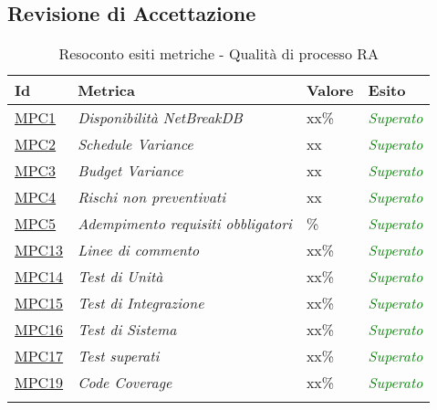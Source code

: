 \subsection{Revisione di Accettazione}

\begin{longtable}{|>{\centering\arraybackslash}p{2cm}|>{\centering\arraybackslash}p{5cm}|>{\centering\arraybackslash}p{3cm}|>{\centering\arraybackslash}p{3cm}|}
	\hline
	\rowcolor{Gray}
	\textbf{Id} & \textbf{Metrica} & \textbf{Valore} & \textbf{Esito} \\
	\hline
	\hyperlink{MPC1}{MPC1} & \textit{Disponibilità \textit{NetBreakDB}} & xx\% & \textcolor{Green}{\textit{Superato}}\\
	\hline
	\hyperlink{MPC2}{MPC2} & \textit{Schedule Variance} & xx & \textcolor{Green}{\textit{Superato}}\\
	\hline
	\hyperlink{MPC3}{MPC3} & \textit{Budget Variance} & xx & \textcolor{Green}{\textit{Superato}}\\
	\hline
	\hyperlink{MPC4}{MPC4} & \textit{Rischi non preventivati} & xx & \textcolor{Green}{\textit{Superato}}\\
	\hline
	\hyperlink{MPC5}{MPC5} & \textit{Adempimento requisiti obbligatori} & 100\% & \textcolor{Green}{\textit{Superato}}\\
	\hline
	\hyperlink{MPC13}{MPC13} & \textit{Linee di commento} & xx\% & \textcolor{Green}{\textit{Superato}}\\
	\hline
	\hyperlink{MPC14}{MPC14} & \textit{Test di Unità} & xx\% & \textcolor{Green}{\textit{Superato}}\\
	\hline
	\hyperlink{MPC15}{MPC15} & \textit{Test di Integrazione} & xx\% & \textcolor{Green}{\textit{Superato}}\\
	\hline
	\hyperlink{MPC16}{MPC16} & \textit{Test di Sistema} & xx\% & \textcolor{Green}{\textit{Superato}}\\
	\hline
	\hyperlink{MPC17}{MPC17} & \textit{Test superati} & xx\% & \textcolor{Green}{\textit{Superato}}\\
	\hline
	\hyperlink{MPC19}{MPC19} & \textit{Code Coverage} & xx\% & \textcolor{Green}{\textit{Superato}}\\
	\hline
	
	\caption{Resoconto esiti metriche - Qualità di processo RA}
\end{longtable}


